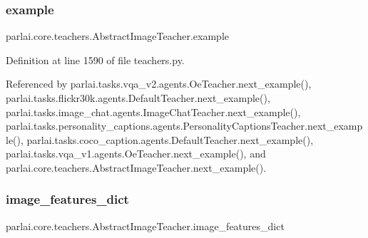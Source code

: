 \mbox{\label{classparlai_1_1core_1_1teachers_1_1AbstractImageTeacher_a404b2e622780e94083ba9539ebaab609}} 
\subsubsection{\texorpdfstring{example}{example}}
{\footnotesize\ttfamily parlai.\+core.\+teachers.\+Abstract\+Image\+Teacher.\+example}



Definition at line 1590 of file teachers.\+py.



Referenced by parlai.\+tasks.\+vqa\+\_\+v2.\+agents.\+Oe\+Teacher.\+next\+\_\+example(), parlai.\+tasks.\+flickr30k.\+agents.\+Default\+Teacher.\+next\+\_\+example(), parlai.\+tasks.\+image\+\_\+chat.\+agents.\+Image\+Chat\+Teacher.\+next\+\_\+example(), parlai.\+tasks.\+personality\+\_\+captions.\+agents.\+Personality\+Captions\+Teacher.\+next\+\_\+example(), parlai.\+tasks.\+coco\+\_\+caption.\+agents.\+Default\+Teacher.\+next\+\_\+example(), parlai.\+tasks.\+vqa\+\_\+v1.\+agents.\+Oe\+Teacher.\+next\+\_\+example(), and parlai.\+core.\+teachers.\+Abstract\+Image\+Teacher.\+next\+\_\+example().

\mbox{\label{classparlai_1_1core_1_1teachers_1_1AbstractImageTeacher_a67fc5068ab7e2c1c718614cc737d6a75}} 
\subsubsection{\texorpdfstring{image\+\_\+features\+\_\+dict}{image\_features\_dict}}
{\footnotesize\ttfamily parlai.\+core.\+teachers.\+Abstract\+Image\+Teacher.\+image\+\_\+features\+\_\+dict}



